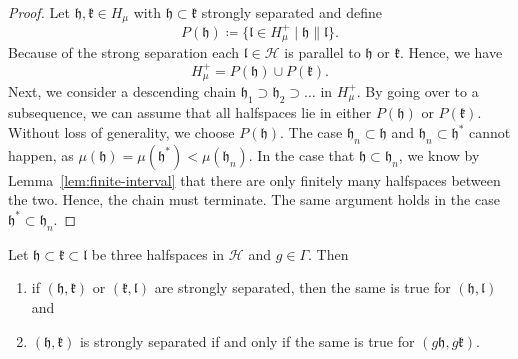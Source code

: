 \begin{proof}
  Let \(\mathfrak{h, k} \in H_\mu\) with \(\mathfrak{h} \subset \mathfrak{k}\) strongly separated and define
  \[
    P(\mathfrak{h}) \coloneqq \{\mathfrak{l} \in H_\mu^+ \mid \mathfrak{h} \parallel \mathfrak{l}\}.
  \]
  Because of the strong separation each \(\mathfrak{l} \in \mathcal{H}\) is parallel to \(\mathfrak{h}\) or \(\mathfrak{k}\). Hence, we have
  \[
    H_\mu^+ = P(\mathfrak{h}) \cup P(\mathfrak{k}).
  \]
  Next, we consider a descending chain \(\mathfrak{h_1} \supset \mathfrak{h_2} \supset \dots\) in \(H_\mu^+\). By going over to a subsequence, we can assume that all halfspaces lie in either \(P(\mathfrak{h})\) or \(P(\mathfrak{k})\). Without loss of generality, we choose \(P(\mathfrak{h})\). The case \(\mathfrak{h}_n \subset \mathfrak{h}\) and \(\mathfrak{h}_n \subset \mathfrak{h}^\ast\) cannot happen, as \(\mu(\mathfrak{h}) = \mu(\mathfrak{h}^\ast) < \mu(\mathfrak{h}_n)\). In the case that \(\mathfrak{h} \subset \mathfrak{h}_n\), we know by Lemma~\ref{lem:finite-interval} that there are only finitely many halfspaces between the two. Hence, the chain must terminate. The same argument holds in the case \(\mathfrak{h}^\ast \subset \mathfrak{h}_n\).
\end{proof}


\begin{lemma}
  \label{lem:strongly-sep}
  Let \(\mathfrak{h} \subset \mathfrak{k} \subset \mathfrak{l}\) be three halfspaces in \(\mathcal{H}\) and \(g \in \Gamma\). Then
  \begin{enumerate}
  \item if \((\mathfrak{h}, \mathfrak{k})\) or \((\mathfrak{k}, \mathfrak{l})\) are strongly separated, then the same is true for \((\mathfrak{h}, \mathfrak{l})\) and
  \item \((\mathfrak{h}, \mathfrak{k})\) is strongly separated if and only if the same is true for \((g\mathfrak{h}, g\mathfrak{k})\).
  \end{enumerate}
\end{lemma}

